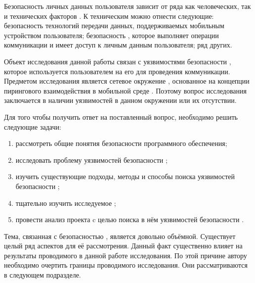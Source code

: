 %
Безопасность личных данных пользователя зависит от ряда как человеческих, так и технических факторов .
%
К техническим можно отнести следующие: безопасность технологий передачи данных, поддерживаемых мобильным устройством пользователя; безопасность , которое выполняет операции коммуникации и имеет доступ к личным данным пользователя; ряд других.

%
Объект исследования данной работы связан с уязвимостями безопасности , которое используется пользователем на его  для проведения коммуникации. 
%
Предметом исследования является сетевое окружение \PeerHood, основанное на концепции пирингового взаимодействия  в мобильной среде .
%
Поэтому вопрос исследования заключается в наличии уязвимостей  в данном окружении или их отсутствии.

%
Для того чтобы получить ответ на поставленный вопрос, необходимо решить следующие задачи:
\begin{enumerate}
	\item рассмотреть общие понятия безопасности программного обеспечения;
	\item исследовать проблему уязвимостей безопасности ;
	\item изучить существующие подходы, методы и способы поиска уязвимостей безопасности 
		;
	\item тщательно изучить исследуемое  \PeerHood;
	\item провести анализ проекта \PeerHood c целью поиска в нём уязвимостей безопасности 
		.
\end{enumerate}

%
Тема, связанная с безопасностью , является довольно объёмной.
%
Существует целый ряд аспектов для её рассмотрения. 
\Sentnce
Данный факт существенно влияет на результаты проводимого в данной работе исследования.
%
По этой причине автору необходимо очертить границы проводимого исследования. 
%
Они рассматриваются в следующем подразделе. 

